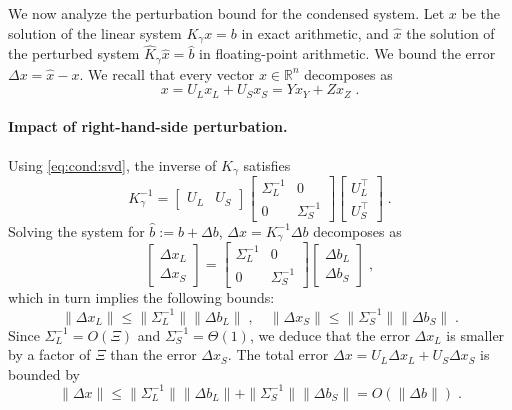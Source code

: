We now analyze the perturbation bound for the condensed system.
Let $x$ be the solution of the linear system $K_\gamma x = b$
in exact arithmetic, and $\widehat{x}$ the solution of
the perturbed system $\widehat{K}_\gamma \widehat{x} = \widehat{b}$
in floating-point arithmetic. We bound
the error $\Delta x = \widehat{x} - x$. We
recall that every vector $x \in \mathbb{R}^n$ decomposes as
\begin{equation}
  x = U_L x_L + U_S x_S = Y x_Y + Z x_Z \; .
\end{equation}

\paragraph{Impact of right-hand-side perturbation.}
Using \eqref{eq:cond:svd}, the inverse of
$K_\gamma$ satisfies
\begin{equation}
  \label{eq:cond:inversecondensed}
  K_\gamma^{-1}  = \begin{bmatrix} U_L & U_S \end{bmatrix}
  \begin{bmatrix}
    \Sigma_L^{-1} & 0 \\ 0 & \Sigma_S^{-1}
  \end{bmatrix}
  \begin{bmatrix}
    U_L^\top \\ U_S^\top
  \end{bmatrix}
  \; .
\end{equation}
Solving the system for $\widehat{b} := b + \Delta b$,
$\Delta x = K_\gamma^{-1} \Delta b$ decomposes as
\begin{equation}
  \begin{bmatrix}
    \Delta x_L \\ \Delta x_S
  \end{bmatrix}
  =
  \begin{bmatrix}
    \Sigma_L^{-1} & 0 \\ 0 & \Sigma_S^{-1}
  \end{bmatrix}
  \begin{bmatrix}
    \Delta b_L \\ \Delta b_S
  \end{bmatrix}
  \; ,
\end{equation}
which in turn implies the following bounds:
\begin{equation}
  \label{eq:cond:rhserror}
     \| \Delta x_L \| \leq \| \Sigma_L^{-1} \| \| \Delta b_L \| \; ,\quad
    \| \Delta x_S \| \leq \| \Sigma_S^{-1} \| \| \Delta b_S \| \; .
\end{equation}
Since $\Sigma_L^{-1} = O(\Xi)$ and $\Sigma_S^{-1} = \Theta(1)$,
we deduce that the error $\Delta x_L$ is smaller by a factor
of $\Xi$ than the error $\Delta x_S$. The total error
$\Delta x = U_L \Delta x_L + U_S \Delta x_S$ is bounded by
\begin{equation}
  \label{eq:cond:rhserrorfull}
  \| \Delta x \|
  \leq  \| \Sigma_L^{-1} \| \| \Delta b_L \| + \| \Sigma_S^{-1} \| \| \Delta b_S \| =
  O(\|\Delta b \|) \; .
\end{equation}

